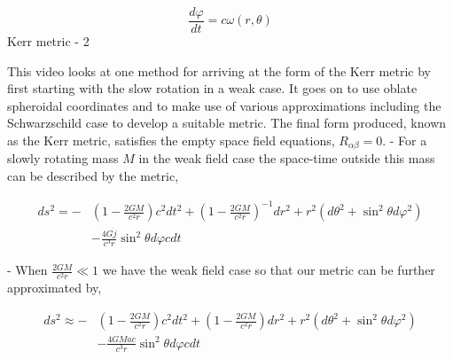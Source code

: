 $$
    \frac{d \varphi}{d t}=c \omega(r, \theta)
$$
Kerr metric - 2

This video looks at one method for arriving at the form of the Kerr metric by first starting with the slow rotation in a weak case. It goes on to use oblate spheroidal coordinates and to make use of various approximations including the Schwarzschild case to develop a suitable metric. The final form produced, known as the Kerr metric, satisfies the empty space field equations, $R_{\alpha \beta}=0$.
- For a slowly rotating mass $M$ in the weak field case the space-time outside this mass can be described by the metric,


\begin{align}
    d s^2=- & \left(1-\frac{2 G M}{c^2 r}\right) c^2 d t^2+\left(1-\frac{2 G M}{c^2 r}\right)^{-1} d r^2+r^2\left(d \theta^2+\sin ^2 \theta d \varphi^2\right) \\
            & -\frac{4 G \dot{j}}{c^3 r} \sin ^2 \theta d \varphi c d t
\end{align}


- When $\frac{2 G M}{c^2 r} \ll 1$ we have the weak field case so that our metric can be further approximated by,


\begin{align}
    d s^2 \approx- & \left(1-\frac{2 G M}{c^2 r}\right) c^2 d t^2+\left(1-\frac{2 G M}{c^2 r}\right) d r^2+r^2\left(d \theta^2+\sin ^2 \theta d \varphi^2\right) \\
                   & -\frac{4 G M a c}{c^3 r} \sin ^2 \theta d \varphi c d t
\end{align}


